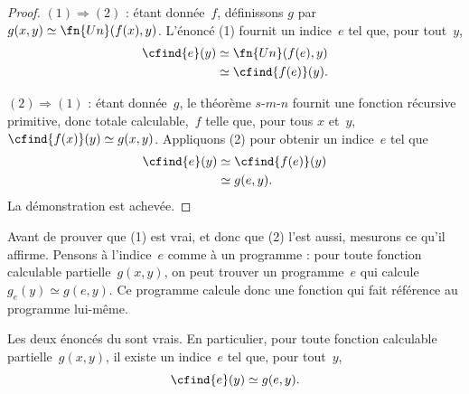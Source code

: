 \documentclass[../../../include/open-logic-section]{subfiles}
\begin{document}
\begin{proof}
$(1)\Rightarrow(2)$ : étant donnée~$f$,
définissons $g$ par
$g(x,y)\simeq\fn{Un}(f(x),y)$.
L'énoncé (1) fournit un indice~$e$ tel que,
pour tout~$y$,
\begin{align*}
\cfind{e}(y) & \simeq \fn{Un}(f(e),y) \\
& \simeq \cfind{f(e)}(y).
\end{align*}

$(2)\Rightarrow(1)$ : étant donnée~$g$,
le théorème $s$-$m$-$n$ fournit une fonction récursive primitive, donc totale calculable,~$f$
telle que, pour tous $x$ et~$y$,
$\cfind{f(x)}(y)\simeq g(x,y)$.
Appliquons (2) pour obtenir un indice~$e$ tel que
\begin{align*}
\cfind{e}(y) & \simeq \cfind{f(e)}(y) \\
& \simeq g(e,y).
\end{align*}
La démonstration est achevée.
\end{proof}

\begin{explain}
Avant de prouver que (1) est vrai, et donc que
(2) l'est aussi, mesurons ce qu'il affirme.
Pensons à l'indice~$e$ comme à un programme :
pour toute fonction calculable partielle~$g(x,y)$,
on peut trouver un programme~$e$ qui calcule
$g_e(y)\simeq g(e,y)$. Ce programme calcule
donc une fonction qui fait référence au
programme lui-même.
\end{explain}

\begin{thm}
Les deux énoncés du 
sont vrais. En particulier, pour toute fonction
calculable partielle~$g(x,y)$, il existe un
indice~$e$ tel que, pour tout~$y$,
\[
\cfind{e}(y) \simeq g(e,y).
\]
\end{thm}
\end{document}
